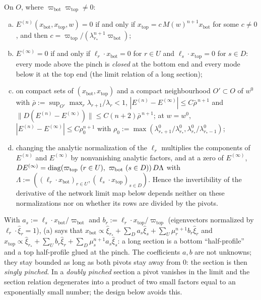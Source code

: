 \documentclass[11pt,a4paper]{report}
\newcommand{\xb}{x_{\mathrm{bot}}}
\newcommand{\xt}{x_{\mathrm{top}}}
\newcommand{\piv}{\varpi}
\begin{document}
\begin{lemma}\label{lem:productform}
On \(O\), where \(\piv_{\mathrm{bot}}\piv_{\mathrm{top}}\ne0\):
\begin{enumerate}[(a)]
\item \(E^{(n)}(\xb,\xt,w)=0\) if and only if \(\xt=c\,M(w)^{n+1}\xb\) for some \(c\ne0\), and then
\(c=\piv_{\mathrm{top}}/(\lambda_{r_*}^{n+1}\piv_{\mathrm{bot}})\);
\item \(E^{(\infty)}=0\) if and only if \(\ell_r\cdot\xb=0\) for \(r\in U\) and \(\ell_s\cdot\xt=0\) for \(s\in D\): every mode above the
pinch is \emph{closed} at the bottom end and every mode below it at the top end (the limit relation of a long section);
\item on compact sets of \((\xb,\xt)\) and a compact neighbourhood \(O'\subset O\) of \(w^0\) with
\(\bar\rho:=\sup_{O'}\max_r\lambda_{r+1}/\lambda_r<1\), \(|E^{(n)}-E^{(\infty)}|\le C\bar\rho^{\,n+1}\) and
\(\|D(E^{(n)}-E^{(\infty)})\|\le C(n+2)\bar\rho^{\,n+1}\); at \(w=w^0\), \(|E^{(n)}-E^{(\infty)}|\le C\rho_0^{n+1}\) with
\(\rho_0:=\max(\lambda^0_{r_*+1}/\lambda^0_{r_*},\lambda^0_{r_*}/\lambda^0_{r_*-1})\);
\item changing the analytic normalization of the \(\ell_r\) multiplies the components of \(E^{(n)}\) and \(E^{(\infty)}\) by
nonvanishing analytic factors, and at a zero of \(E^{(\infty)}\),
\(DE^{(\infty)}=\diag(\piv_{\mathrm{top}}\ (r\in U),\ \piv_{\mathrm{bot}}\ (s\in D))\,D\Lambda\) with
\(\Lambda:=((\ell_r\cdot\xb)_{r\in U},(\ell_s\cdot\xt)_{s\in D})\). Hence the invertibility of the derivative of the network limit map
below depends neither on these normalizations nor on whether its rows are divided by the pivots.
\end{enumerate}
\end{lemma}

With \(a_s:=\ell_s\cdot\xb/\piv_{\mathrm{bot}}\) and \(b_r:=\ell_r\cdot\xt/\piv_{\mathrm{top}}\) (eigenvectors normalized by
\(\ell_r\cdot\hat\xi_r=1\)), (a) says that \(\xb\propto\hat\xi_{r_*}+\sum_Da_s\hat\xi_s+\sum_U\mu_r^{n+1}b_r\hat\xi_r\) and
\(\xt\propto\hat\xi_{r_*}+\sum_Ub_r\hat\xi_r+\sum_D\mu_s^{n+1}a_s\hat\xi_s\): a long section is a bottom ``half-profile'' and a
top half-profile glued at the pinch. The coefficients \(a,b\) are not unknowns; they stay bounded as long as both pivots
stay away from \(0\): the section is then \emph{singly pinched}. In a \emph{doubly pinched} section a pivot vanishes in the
limit and the section relation degenerates into a product of two small factors equal to an exponentially small number;
the design below avoids this.
\end{document}
